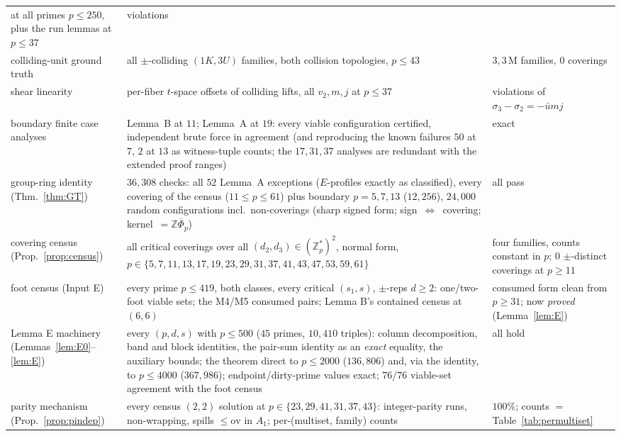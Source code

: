 \documentclass[11pt,a4paper]{article}
\numberwithin{equation}{section}
\theoremstyle{plain}
\theoremstyle{definition}
\theoremstyle{remark}
\newcommand{\Z}{\mathbb{Z}}
\begin{document}
\begin{longtable}{@{}p{3.7cm}>{\raggedright\arraybackslash}p{8.2cm}>{\raggedright\arraybackslash}p{3.1cm}@{}}
  at all primes $p\le250$, plus the run lemmas at $p\le37$ & 0 violations \\
colliding-unit ground truth & all $\pm$-colliding $(1K,3U)$ families,
  both collision topologies, $p\le43$ & $3{,}3$\,M families, 0 coverings \\
shear linearity & per-fiber $t$-space offsets of colliding lifts,
  all $v_2,m,j$ at $p\le37$ & 0 violations of $\sigma_3-\sigma_2=-\bar u mj$ \\
boundary finite case analyses & Lemma~B at $11$; Lemma~A at $19$: every
  viable configuration certified, independent brute force in
  agreement (and reproducing the known failures $50$ at $7$, $2$ at $13$
  as witness-tuple counts; the $17,31,37$ analyses are redundant with the extended proof ranges) & exact \\
group-ring identity (Thm.~\ref{thm:GT}) & $36{,}308$ checks: all $52$
  Lemma~A exceptions ($E$-profiles exactly as classified), every covering
  of the census ($11\le p\le 61$) plus boundary $p=5,7,13$ ($12{,}256$),
  $24{,}000$ random configurations
  incl.\ non-coverings (sharp signed form; sign~$\Leftrightarrow$~covering;
  kernel~$=\Z\overline\Phi_p$) & all pass \\
covering census (Prop.~\ref{prop:census}) & all critical coverings over
  all $(d_2,d_3)\in(\Z_p^*)^2$, normal form, $p\in\{5,7,11,13,17,19,23,29,31,37,41,43,47,53,59,61\}$
  & four families, counts constant in $p$; $0$ $\pm$-distinct coverings at
  $p\ge11$ \\
foot census (Input E) & every prime $p\le419$, both classes, every
  critical $(s_1,s)$, $\pm$-reps $d\ge2$: one/two-foot viable sets;
  the M4/M5 consumed pairs; Lemma B's contained census at $(6,6)$ &
  consumed form clean from $p\ge31$; now \emph{proved}
  (Lemma~\ref{lem:E}) \\
Lemma E machinery (Lemmas~\ref{lem:E0}--\ref{lem:E}) & every $(p,d,s)$
  with $p\le500$ ($45$ primes, $10{,}410$ triples): column decomposition,
  band and block identities, the pair-sum identity as an \emph{exact}
  equality, the auxiliary bounds; the theorem direct to $p\le2000$
  ($136{,}806$) and, via the identity, to $p\le4000$ ($367{,}986$);
  endpoint/dirty-prime values exact; $76$/$76$ viable-set agreement with
  the foot census & all hold \\
parity mechanism (Prop.~\ref{prop:pindep}) & every census $(2,2)$ solution
  at $p\in\{23,29,41,31,37,43\}$: integer-parity runs, non-wrapping,
  spills $\le\mathrm{ov}$ in $A_1$; per-(multiset, family) counts &
  $100\%$; counts $=$ Table~\ref{tab:permultiset} \\

\end{longtable}
\end{document}
